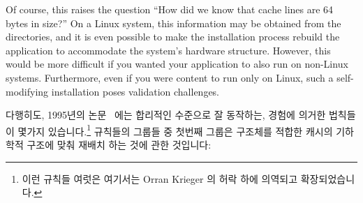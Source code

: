Of course, this raises the question ``How did we know that cache lines
are 64 bytes in size?''
On a Linux system, this information may be obtained from the
 directories, and it is even
possible to make the installation process rebuild the application to
accommodate the system's hardware structure.
However, this would be more difficult if you wanted your application to
also run on non-Linux systems.
Furthermore, even if you were content to run only on Linux, such a
self-modifying installation poses validation challenges.
\fi

다행히도, 1995년의 논문~\cite{BenjaminGamsa95a} 에는 합리적인 수준으로 잘
동작하는, 경험에 의거한 법칙들이 몇가지 있습니다.\footnote{
	이런 규칙들 여럿은 여기서는 Orran Krieger 의 허락 하에 의역되고
	확장되었습니다.}
규칙들의 그룹들 중 첫번째 그룹은 구조체를 적합한 캐시의 기하학적 구조에 맞춰
재배치 하는 것에 관한 것입니다:

